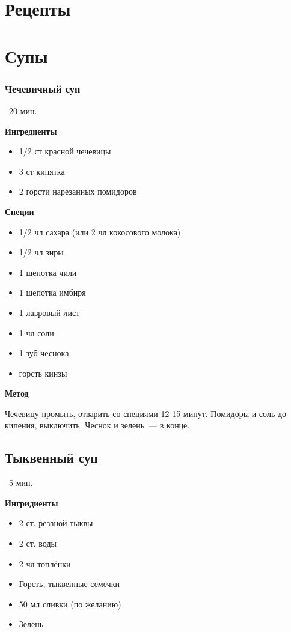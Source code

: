 \chapter{Рецепты}

\chapter*{Супы}
\label{sec:soup}

\newpage
\subsection*{\Large Чечевичный суп}
\label{sec:soupLent}
\faClockO\ 20 мин.

\textbf{\large Ингредиенты}
\begin{itemize}
\item 1/2 ст красной чечевицы
\item 3 ст кипятка
\item 2 горсти нарезанных помидоров
\end{itemize}

\textbf{Специи}
\begin{itemize}
\item 1/2 чл сахара (или 2 чл кокосового молока)
\item 1/2 чл зиры
\item 1 щепотка чили
\item 1 щепотка имбиря
\item 1 лавровый лист
\item 1 чл соли
\item 1 зуб чеснока
\item горсть кинзы
\end{itemize}

\textbf{\large Метод}

Чечевицу промыть, отварить со специями 12-15 минут. Помидоры и соль до кипения, выключить. Чеснок и зелень~--- в конце. %


\newpage
\section*{\Large Тыквенный суп}
\label{sec:soup2}

\faClockO\ 5 мин.

\textbf{\large Ингридиенты}
\begin{itemize}
\item 2 ст. резаной тыквы
\item 2 ст. воды
\item 2 чл топлёнки
\item Горсть, тыквенные семечки 
\item 50 мл сливки (по желанию)
\item Зелень
\end{itemize}

